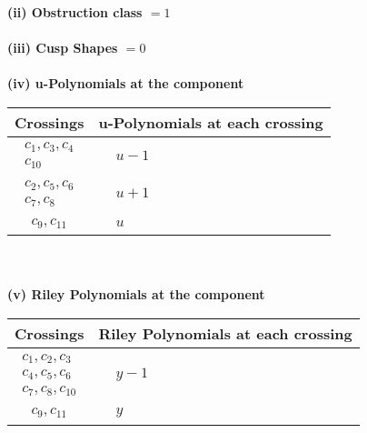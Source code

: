 \documentclass[1p]{elsarticle_modified}
\theoremstyle{definition}
\begin{document}
\flushleft \textbf{(ii) Obstruction class $= 1$}\\~\\
\flushleft \textbf{(iii) Cusp Shapes $= 0$}\\~\\
\newpage\renewcommand{\arraystretch}{1}
\flushleft \textbf{(iv) u-Polynomials at the component}\newline \\
\begin{tabular}{m{50pt}|m{274pt}}
Crossings & \hspace{64pt}u-Polynomials at each crossing \\
\hline $$\begin{aligned}c_{1},c_{3},c_{4}\\c_{10}\end{aligned}$$&$\begin{aligned}
&u-1
\end{aligned}$\\
\hline $$\begin{aligned}c_{2},c_{5},c_{6}\\c_{7},c_{8}\end{aligned}$$&$\begin{aligned}
&u+1
\end{aligned}$\\
\hline $$\begin{aligned}c_{9},c_{11}\end{aligned}$$&$\begin{aligned}
&u
\end{aligned}$\\
\hline
\end{tabular}\\~\\
\newpage\renewcommand{\arraystretch}{1}
\flushleft \textbf{(v) Riley Polynomials at the component}\newline \\
\begin{tabular}{m{50pt}|m{274pt}}
Crossings & \hspace{64pt}Riley Polynomials at each crossing \\
\hline $$\begin{aligned}c_{1},c_{2},c_{3}\\c_{4},c_{5},c_{6}\\c_{7},c_{8},c_{10}\end{aligned}$$&$\begin{aligned}
&y-1
\end{aligned}$\\
\hline $$\begin{aligned}c_{9},c_{11}\end{aligned}$$&$\begin{aligned}
&y
\end{aligned}$\\
\hline
\end{tabular}\\~\\
\end{document}
